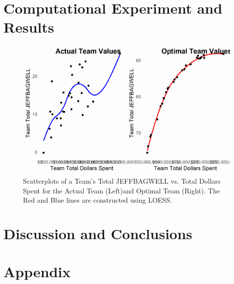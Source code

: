 \documentclass{article}
\begin{document}
\section{Computational Experiment and Results}

\begin{figure}[h]
\caption{Scatterplots of a Team's Total JEFFBAGWELL vs. Total Dollars Spent for the Actual Team (Left)and Optimal Team (Right). The Red and Blue lines are constructed using LOESS.} 
\label{fig:cowplot}
\centering
\includegraphics[width=0.7\paperwidth, scale=1.25]{bwar_salary_scatter_cowplot.png}
\end{figure}


%

\section{Discussion and Conclusions}


%
%

\section{Appendix}
\end{document}
